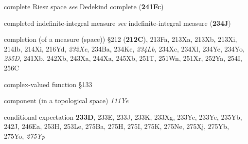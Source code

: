 complete Riesz space {\it see} Dedekind complete ({\bf 241Fc})










completed indefinite-integral measure {\it see}
indefinite-integral measure ({\bf 234J})
























{completion } (of a measure (space))
\S212 ({\bf 212C}), 213Fa, 213Xa, 213Xb, 213Xi, 214Ib, 214Xi, 216Yd,
{\it 232Xe}, 234Ba, 234Ke, {\it 234Lb}, 234Xc, 234Xl, 234Ye, 234Yo,
{\it 235D}, 241Xb, 242Xb, 243Xa, 244Xa,
245Xb, 251T, 251Wn, 251Xr, 252Ya, 254I, 256C






















complex-valued function \S133

component 
  (in a topological space) {\it 111Ye}





























conditional expectation {\bf 233D}, 233E, 233J, 233K, 233Xg, 233Yc,
233Ye, 235Yb, 242J, 246Ea, 253H, 253Le,
275Ba, 275H, 275I, 275K, 275Ne, 275Xj, 275Yb, 275Yo, {\it 275Yp}


